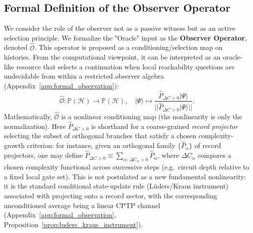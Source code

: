 \subsection{Formal Definition of the Observer Operator}
We consider the role of the observer not as a passive witness but as an active selection principle. We formalize the "Oracle" input as the \textbf{Observer Operator}, denoted $\hat{\mathcal{O}}$.
This operator is proposed as a conditioning/selection map on histories. From the computational viewpoint, it can be interpreted as an oracle-like resource that selects a continuation when local reachability questions are undecidable from within a restricted observer algebra (Appendix~\ref{app:formal_observation}):
\begin{equation}
    \hat{\mathcal{O}}: \mathbb{P}(\mathcal{H}) \to \mathbb{P}(\mathcal{H}), \quad |\Psi\rangle \mapsto \frac{\hat{P}_{\Delta C > 0} |\Psi\rangle}{||\hat{P}_{\Delta C > 0} |\Psi\rangle||}.
\end{equation}
Mathematically, $\hat{\mathcal{O}}$ is a nonlinear conditioning map (the nonlinearity is only the normalization). Here $\hat{P}_{\Delta C > 0}$ is shorthand for a coarse-grained \emph{record projector} selecting the subset of orthogonal branches that satisfy a chosen complexity-growth criterion: for instance, given an orthogonal family $\{\hat P_\alpha\}$ of record projectors, one may define $\hat{P}_{\Delta C > 0}\equiv \sum_{\alpha:\,\Delta C_\alpha>0}\hat P_\alpha$, where $\Delta C_\alpha$ compares a chosen complexity functional across successive steps (e.g.\ circuit depth relative to a fixed local gate set).
This is not postulated as a new fundamental nonlinearity: it is the standard conditional state-update rule (L{\"u}ders/Kraus instrument) associated with projecting onto a record sector, with the corresponding unconditioned average being a linear CPTP channel (Appendix~\ref{app:formal_observation}, Proposition~\ref{prop:luders_kraus_instrument}).

